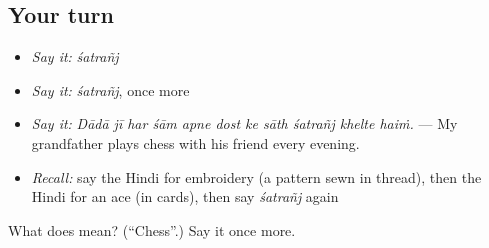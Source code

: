 \subsection*{Your turn}
\begin{itemize}
\raggedright
  \item \emph{Say it:} \emph{śatrañj}
  \item \emph{Say it:} \emph{śatrañj}, once more
  \item \emph{Say it:} \emph{Dādā jī har śām apne dost ke sāth śatrañj khelte haiṁ.} — My grandfather plays chess with his friend every evening.
  \item \emph{Recall:} say the Hindi for embroidery (a pattern sewn in thread), then the Hindi for an ace (in cards), then say \emph{śatrañj} again
\end{itemize}

\begin{tcolorbox}[breakable,colback=teal!4,colframe=teal!35!black,title={Before you move on}]
What does  mean? (\textquotedblleft{}Chess\textquotedblright{}.) Say it once more.
\end{tcolorbox}
